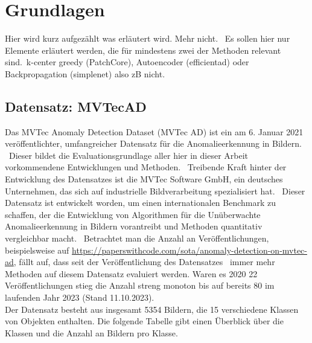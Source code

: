 
\chapter{Grundlagen}\label{ch:Grundlagen}
Hier wird kurz aufgezählt was erläutert wird. Mehr nicht. \
Es sollen hier nur Elemente erläutert werden, die für mindestens zwei der Methoden relevant sind.\
k-center greedy (PatchCore), Autoencoder (efficientad) oder Backpropagation (simplenet) also zB nicht.\

\section{Datensatz: MVTecAD\cite{mvtecad}}\label{sec:DatensatzMVTecAD}
Das \glqq MVTec Anomaly Detection Dataset\grqq{} (MVTec AD) ist ein am 6. Januar 2021 veröffentlichter, umfangreicher Datensatz für die Anomalieerkennung in Bildern. \
Dieser bildet die Evaluationsgrundlage aller hier in dieser Arbeit vorkommendene Entwicklungen und Methoden. \
Treibende Kraft hinter der Entwicklung des Datensatzes ist die MVTec Software GmbH, ein deutsches Unternehmen, das sich auf industrielle Bildverarbeitung spezialisiert hat. \
Dieser Datensatz ist entwickelt worden, um einen internationalen Benchmark zu schaffen, der die Entwicklung von Algorithmen für die Unüberwachte Anomalieerkennung in Bildern vorantreibt und Methoden quantitativ vergleichbar macht. \
Betrachtet man die Anzahl an Veröffentlichungen, beispielsweise auf \url{https://paperswithcode.com/sota/anomaly-detection-on-mvtec-ad}, fällt auf, dass seit der Veröffentlichung des Datensatzes \
immer mehr Methoden auf diesem Datensatz evaluiert werden. Waren es 2020 22 Veröffentlichungen stieg die Anzahl streng monoton bis auf bereits 80 im laufenden Jahr 2023 (Stand 11.10.2023). \\
Der Datensatz besteht aus insgesamt 5354 Bildern, die 15 verschiedene Klassen von Objekten enthalten. Die folgende Tabelle gibt einen Überblick über die Klassen und die Anzahl an Bildern pro Klasse. \
